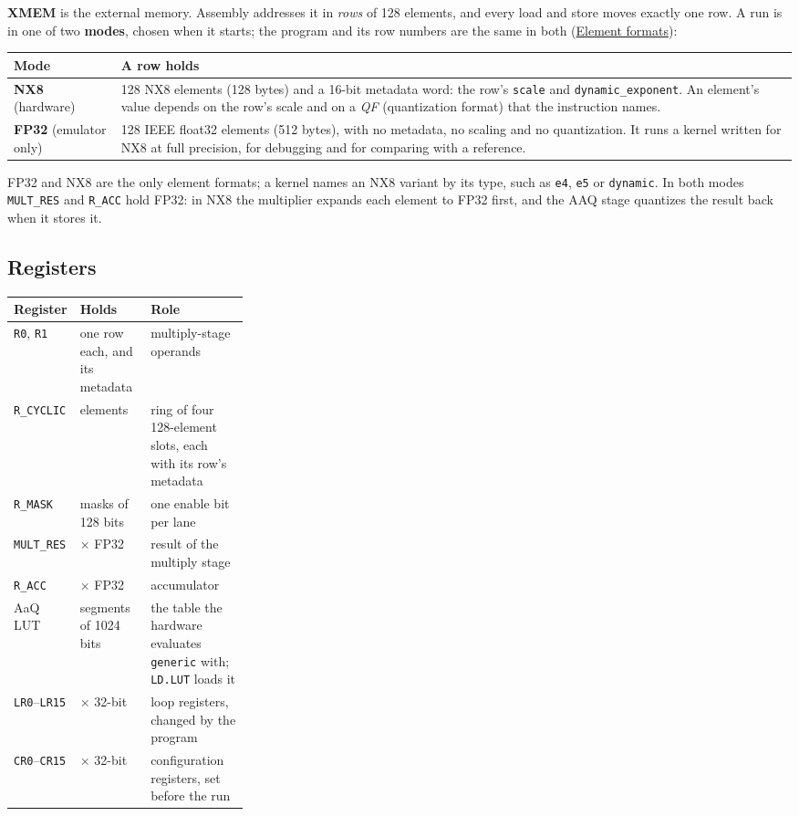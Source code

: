 \documentclass[11pt,a4paper]{article}
\newcommand{\doc}[2]{\href{https://rechefe.github.io/ipu-emulator/dev/#1/}{\textcolor{accent}{#2}}}
\begin{document}
\textbf{XMEM} is the external memory. Assembly addresses it in \emph{rows} of
128 elements, and every load and store moves exactly one row. A run is in one
of two \textbf{modes}, chosen when it starts; the program and its row numbers
are the same in both (\doc{explanation/element-formats}{Element formats}):

\begin{center}
\begin{tabularx}{\linewidth}{lX}
\toprule
Mode & A row holds \\
\midrule
\textbf{NX8} (hardware) & 128 NX8 elements (128 bytes) and a 16-bit metadata
word: the row's \texttt{scale} and \texttt{dynamic\_exponent}. An element's
value depends on the row's scale and on a \emph{QF} (quantization format) that
the instruction names. \\
\textbf{FP32} (emulator only) & 128 IEEE float32 elements (512 bytes), with no
metadata, no scaling and no quantization. It runs a kernel written for NX8 at
full precision, for debugging and for comparing with a reference. \\
\bottomrule
\end{tabularx}
\end{center}

FP32 and NX8 are the only element formats; a kernel names an NX8 variant by
its type, such as \texttt{e4}, \texttt{e5} or \texttt{dynamic}. In both modes
\texttt{MULT\_RES} and \texttt{R\_ACC} hold FP32: in NX8 the multiplier expands
each element to FP32 first, and the AAQ stage quantizes the result back when
it stores it.

\needspace{7cm}
\subsection{Registers}

\begin{center}
\begin{tabularx}{\linewidth}{l>{\raggedright\arraybackslash}p{0.3\linewidth}X}
\toprule
Register & Holds & Role \\
\midrule
\texttt{R0}, \texttt{R1} & one row each, and its metadata & multiply-stage operands \\
\texttt{R\_CYCLIC} & 512 elements & ring of four 128-element slots, each with its row's metadata \\
\texttt{R\_MASK} & 8 masks of 128 bits & one enable bit per lane \\
\texttt{MULT\_RES} & 128 $\times$ FP32 & result of the multiply stage \\
\texttt{R\_ACC} & 128 $\times$ FP32 & accumulator \\
AaQ LUT & 5 segments of 1024 bits & the table the hardware evaluates \texttt{generic} with; \texttt{LD.LUT} loads it \\
\texttt{LR0}--\texttt{LR15} & 16 $\times$ 32-bit & loop registers, changed by the program \\
\texttt{CR0}--\texttt{CR15} & 16 $\times$ 32-bit & configuration registers, set before the run \\
\bottomrule
\end{tabularx}
\end{center}
\end{document}

